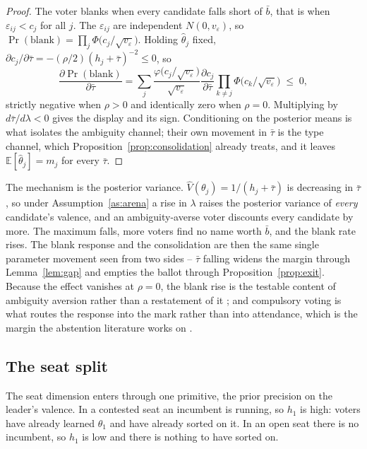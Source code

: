 \documentclass[11pt]{article}
\theoremstyle{definition}
\theoremstyle{remark}
\begin{document}
\begin{proof}
The voter blanks when every candidate falls short of $\bar b$, that is when
$\varepsilon_{ij} < c_j$ for all $j$. The $\varepsilon_{ij}$ are independent
$N(0,v_\varepsilon)$, so
$\Pr(\mathrm{blank}) = \prod_j \Phi\bigl(c_j/\sqrt{v_\varepsilon}\bigr)$.
Holding $\hat\theta_j$ fixed,
$\partial c_j/\partial\bar\tau = -(\rho/2)(h_j+\bar\tau)^{-2} \le 0$, so
\[
  \frac{\partial \Pr(\mathrm{blank})}{\partial \bar\tau}
  = \sum_j
    \frac{\varphi\bigl(c_j/\sqrt{v_\varepsilon}\bigr)}{\sqrt{v_\varepsilon}}
    \frac{\partial c_j}{\partial \bar\tau}
    \prod_{k\ne j}\Phi\bigl(c_k/\sqrt{v_\varepsilon}\bigr) \;\le\; 0,
\]
strictly negative when $\rho > 0$ and identically zero when $\rho = 0$.
Multiplying by $d\bar\tau/d\lambda < 0$ gives the display and its sign.
Conditioning on the posterior means is what isolates the ambiguity channel;
their own movement in $\bar\tau$ is the type channel, which
Proposition~\ref{prop:consolidation} already treats, and it leaves
$\mathbb{E}[\hat\theta_j] = m_j$ for every $\bar\tau$.
\end{proof}

The mechanism is the posterior variance. $\hat V(\theta_j) = 1/(h_j +
\bar\tau)$ is decreasing in $\bar\tau$, so under Assumption~\ref{as:arena} a
rise in $\lambda$ raises the posterior variance of \emph{every} candidate's
valence, and an ambiguity-averse voter discounts every candidate by more. The
maximum falls, more voters find no name worth $\bar b$, and the blank rate
rises. The blank response and the consolidation are then the same single
parameter movement seen from two sides -- $\bar\tau$ falling widens the margin
through Lemma~\ref{lem:gap} and empties the ballot through
Proposition~\ref{prop:exit}. Because the effect vanishes at $\rho = 0$, the
blank rise is the testable content of ambiguity aversion rather than a
restatement of it \citep{ghirardato2006}; and compulsory voting is what routes
the response into the mark rather than into attendance, which is the margin
the abstention literature works on \citep{feddersen1996}.

\subsection{The seat split}

The seat dimension enters through one primitive, the prior precision on the
leader's valence. In a contested seat an incumbent is running, so $h_1$ is
high: voters have already learned $\theta_1$ and have already sorted on it. In
an open seat there is no incumbent, so $h_1$ is low and there is nothing to
have sorted on.
\end{document}

